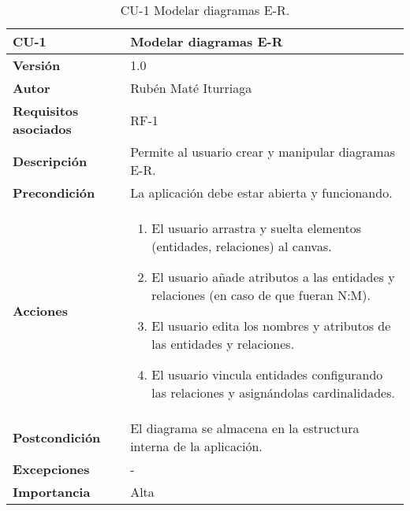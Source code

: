 \begin{table}[p]
	\centering
	\begin{tabularx}{\linewidth}{ p{} p{} }
		\toprule
		\textbf{CU-1}    & \textbf{Modelar diagramas E-R}\\
		\toprule
		\textbf{Versión}              & 1.0    \\
		\textbf{Autor}                & Rubén Maté Iturriaga \\
		\textbf{Requisitos asociados} & RF-1 \\
		\textbf{Descripción}          & Permite al usuario crear y manipular diagramas E-R. \\
		\textbf{Precondición}         & La aplicación debe estar abierta y funcionando. \\
		\textbf{Acciones}             &
		\begin{enumerate}
			\def\labelenumi{\arabic{enumi}.}
			\tightlist
			\item El usuario arrastra y suelta elementos (entidades, relaciones) al canvas.
            \item El usuario añade atributos a las entidades y relaciones (en caso de que fueran N:M).
            \item El usuario edita los nombres y atributos de las entidades y relaciones.
            \item El usuario vincula entidades configurando las relaciones y asignándolas cardinalidades. 
		\end{enumerate}\\
		\textbf{Postcondición}        & El diagrama se almacena en la estructura interna de la aplicación. \\
		\textbf{Excepciones}          & - \\
		\textbf{Importancia}          & Alta \\
		\bottomrule
	\end{tabularx}
	\caption{CU-1 Modelar diagramas E-R.}
\end{table}

